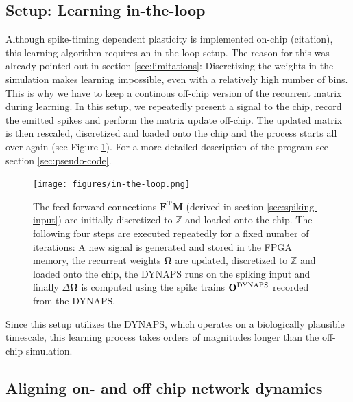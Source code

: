 \documentclass[twoside,11pt]{article}
\begin{document}
\subsection{Setup: Learning in-the-loop}
Although spike-timing dependent plasticity is implemented on-chip (citation), this learning
algorithm requires an in-the-loop setup. The reason for this was already pointed out in
section \ref{sec:limitations}: Discretizing the weights in the simulation
makes learning impossible, even with a relatively high number of bins. This is why
we have to keep a continous off-chip version of the recurrent matrix during learning.
In this setup, we repeatedly present a signal to
the chip, record the emitted spikes and perform the matrix update off-chip. The updated
matrix is then rescaled, discretized and loaded onto the chip and the process starts
all over again (see Figure \ref{fig:in-the-loop}). For a more detailed description of the
program see section \ref{sec:pseudo-code}.

\begin{center}
  \begin{figure}[!htb]
    \texttt{[image: figures/in-the-loop.png]}
    \caption{The feed-forward connections $\mathbf{F^TM}$ (derived in section \ref{sec:spiking-input}) are initially discretized to $\mathbb{Z}$
    and loaded onto the chip. The following four steps are executed repeatedly
    for a fixed number of iterations: A new signal is generated and stored in the
    FPGA memory, the recurrent weights $\mathbf{\Omega}$ are updated, discretized
    to $\mathbb{Z}$ and loaded onto the chip, the DYNAPS runs on the spiking input
     and finally $\Delta \mathbf{\Omega}$ is computed using the spike trains
    $\mathbf{O}^{\textnormal{DYNAPS}}$ recorded from the DYNAPS.}
    \label{fig:in-the-loop}
  \end{figure}
\end{center}

Since this setup utilizes the DYNAPS, which operates on a biologically plausible timescale,
this learning process takes orders of magnitudes longer than the off-chip simulation.

\newpage

\subsection{Aligning on- and off chip network dynamics}
\end{document}
